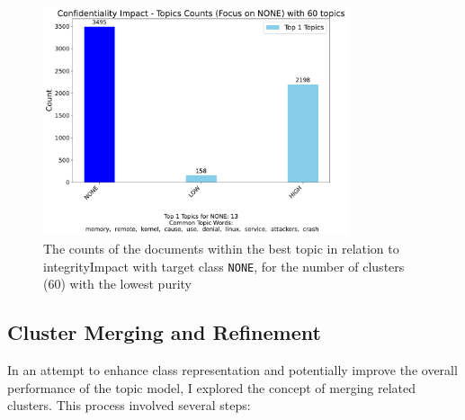 \documentclass[12pt]{article}
\begin{document}
\begin{figure}[ht]
	\centering
	\includegraphics[width=0.8\textwidth]{figures/integrityImpact/integrityImpact_NONE_60_BAD.pdf}
	\caption{The counts of the documents within the best topic in relation to integrityImpact with
		target class \texttt{NONE}, for the number of clusters (60) with the lowest purity}
	\label{fig:integrityImpact_60_NONE_BAD}
\end{figure}


\subsection{Cluster Merging and Refinement}

In an attempt to enhance class representation and potentially improve the overall performance of the
topic model, I explored the concept of merging related clusters. This process involved several steps:
\end{document}
